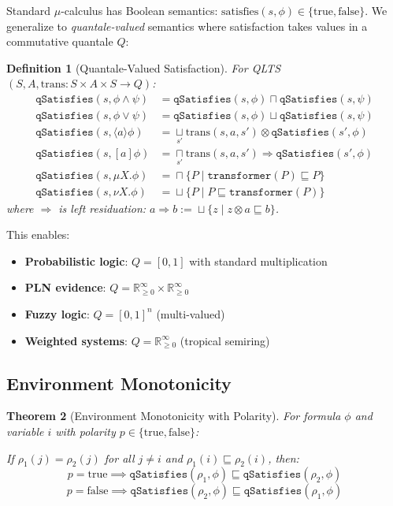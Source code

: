 \documentclass[11pt]{article}
\newtheorem{theorem}{Theorem}
\newtheorem{definition}[theorem]{Definition}
\newcommand{\bigsqcap}{\mathop{\textstyle\sqcap}\limits}
\newcommand{\bigsqcup}{\mathop{\textstyle\sqcup}\limits}
\begin{document}
Standard $\mu$-calculus has Boolean semantics: $\text{satisfies}(s, \phi) \in \{\text{true}, \text{false}\}$. We generalize to \emph{quantale-valued} semantics where satisfaction takes values in a commutative quantale $Q$:

\begin{definition}[Quantale-Valued Satisfaction]
For QLTS $(S, A, \text{trans}: S \times A \times S \to Q)$:
\begin{align*}
\texttt{qSatisfies}(s, \phi \land \psi) &= \texttt{qSatisfies}(s, \phi) \sqcap \texttt{qSatisfies}(s, \psi) \\
\texttt{qSatisfies}(s, \phi \lor \psi) &= \texttt{qSatisfies}(s, \phi) \sqcup \texttt{qSatisfies}(s, \psi) \\
\texttt{qSatisfies}(s, \langle a \rangle \phi) &= \bigsqcup_{s'} \text{trans}(s, a, s') \otimes \texttt{qSatisfies}(s', \phi) \\
\texttt{qSatisfies}(s, [a] \phi) &= \bigsqcap_{s'} \text{trans}(s, a, s') \Rightarrow \texttt{qSatisfies}(s', \phi) \\
\texttt{qSatisfies}(s, \mu X.\phi) &= \bigsqcap \{P \mid \texttt{transformer}(P) \sqsubseteq P\} \\
\texttt{qSatisfies}(s, \nu X.\phi) &= \bigsqcup \{P \mid P \sqsubseteq \texttt{transformer}(P)\}
\end{align*}
where $\Rightarrow$ is left residuation: $a \Rightarrow b := \bigsqcup\{z \mid z \otimes a \sqsubseteq b\}$.
\end{definition}

This enables:
\begin{itemize}
\item \textbf{Probabilistic logic}: $Q = [0,1]$ with standard multiplication
\item \textbf{PLN evidence}: $Q = \mathbb{R}_{\geq 0}^\infty \times \mathbb{R}_{\geq 0}^\infty$
\item \textbf{Fuzzy logic}: $Q = [0,1]^n$ (multi-valued)
\item \textbf{Weighted systems}: $Q = \mathbb{R}_{\geq 0}^\infty$ (tropical semiring)
\end{itemize}

\subsection{Environment Monotonicity}

\begin{theorem}[Environment Monotonicity with Polarity]\label{thm:env-mono}
For formula $\phi$ and variable $i$ with polarity $p \in \{\text{true}, \text{false}\}$:

If $\rho_1(j) = \rho_2(j)$ for all $j \neq i$ and $\rho_1(i) \sqsubseteq \rho_2(i)$, then:
\[
p = \text{true} \implies \texttt{qSatisfies}(\rho_1, \phi) \sqsubseteq \texttt{qSatisfies}(\rho_2, \phi)
\]
\[
p = \text{false} \implies \texttt{qSatisfies}(\rho_2, \phi) \sqsubseteq \texttt{qSatisfies}(\rho_1, \phi)
\]
\end{theorem}
\end{document}
